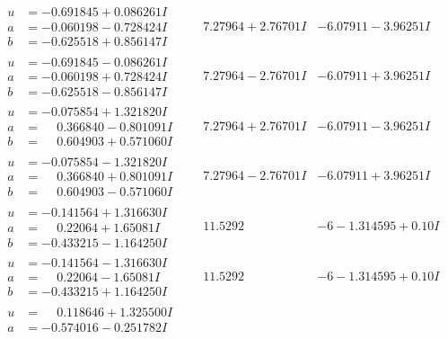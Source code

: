 \documentclass[1p]{elsarticle_modified}
\theoremstyle{definition}
\begin{document}
$$\begin{array}{c|c|c}
\begin{aligned}
u &= -0.691845 + 0.086261 I \\
a &= -0.060198 - 0.728424 I \\
b &= -0.625518 + 0.856147 I\end{aligned}
 & \phantom{-}7.27964 + 2.76701 I & -6.07911 - 3.96251 I \\ \hline\begin{aligned}
u &= -0.691845 - 0.086261 I \\
a &= -0.060198 + 0.728424 I \\
b &= -0.625518 - 0.856147 I\end{aligned}
 & \phantom{-}7.27964 - 2.76701 I & -6.07911 + 3.96251 I \\ \hline\begin{aligned}
u &= -0.075854 + 1.321820 I \\
a &= \phantom{-}0.366840 - 0.801091 I \\
b &= \phantom{-}0.604903 + 0.571060 I\end{aligned}
 & \phantom{-}7.27964 + 2.76701 I & -6.07911 - 3.96251 I \\ \hline\begin{aligned}
u &= -0.075854 - 1.321820 I \\
a &= \phantom{-}0.366840 + 0.801091 I \\
b &= \phantom{-}0.604903 - 0.571060 I\end{aligned}
 & \phantom{-}7.27964 - 2.76701 I & -6.07911 + 3.96251 I \\ \hline\begin{aligned}
u &= -0.141564 + 1.316630 I \\
a &= \phantom{-}0.22064 + 1.65081 I \\
b &= -0.433215 - 1.164250 I\end{aligned}
 & \phantom{-}11.5292\phantom{ +0.000000I} &                  -6
-1.314595 + 0. 10   I\phantom{ +0.000000I} \\ \hline\begin{aligned}
u &= -0.141564 - 1.316630 I \\
a &= \phantom{-}0.22064 - 1.65081 I \\
b &= -0.433215 + 1.164250 I\end{aligned}
 & \phantom{-}11.5292\phantom{ +0.000000I} &                  -6
-1.314595 + 0. 10   I\phantom{ +0.000000I} \\ \hline\begin{aligned}
u &= \phantom{-}0.118646 + 1.325500 I \\
a &= -0.574016 - 0.251782 I \\

\end{aligned}
\end{array}$$
\end{document}
